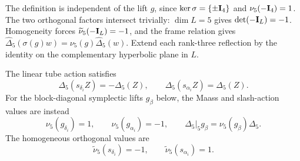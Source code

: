 The definition is independent of the lift \(g\), since
\(\ker\sigma=\{\pm\mathbf{I}_4\}\) and \(\nu_5(-\mathbf{I}_4)=1\).
The two orthogonal factors intersect trivially:
\(\dim L=5\) gives \(\det(-\mathbf{I}_L)=-1\).
Homogeneity forces \(\widetilde\nu_5(-\mathbf{I}_L)=-1\), and the frame
relation gives
\(\widehat\Delta_5(\sigma(g)w)=\nu_5(g)\widehat\Delta_5(w)\).
Extend each rank-three reflection by the identity on the complementary
hyperbolic plane in \(L\).

\begin{lemma}
\label{lem:view1-maass-multiplier-restriction}
The linear tube action satisfies
\[
 \Delta_5(s_{\delta_i}Z)=-\Delta_5(Z),\qquad
 \Delta_5(s_{\alpha_i}Z)=\Delta_5(Z).
\]
For the block-diagonal symplectic lifts \(g_\beta\) below,
the Maass and slash-action values are instead
\[
 \nu_5(g_{\delta_i})=1,\qquad \nu_5(g_{\alpha_i})=-1,
 \qquad \Delta_5|_5g_\beta=\nu_5(g_\beta)\Delta_5.
\]
The homogeneous orthogonal values are
\[
 \widetilde\nu_5(s_{\delta_i})=-1,\qquad
 \widetilde\nu_5(s_{\alpha_i})=1.
\]
\end{lemma}


